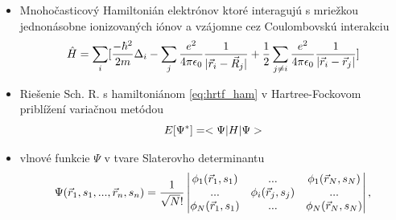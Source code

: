 \documentclass[
	11pt, %
]{beamer}
\begin{document}
\begin{frame}

\begin{itemize}
\item Mnohočasticový Hamiltonián elektrónov ktoré interagujú s mriežkou jednonásobne ionizovaných iónov a vzájomne cez Coulombovskú interakciu 
\begin{equation}
\label{eq:hrtf_ham}
\hat{H}=\sum_i [ \frac{-\hbar^2}{2m}\Delta_i  -\sum_j\frac{e^2}{4\pi \epsilon_0}{\frac{1}{|\vec{r}_i-\vec{R}_j|}} +\frac{1}{2}\sum_{j\neq i}\frac{e^2}{4\pi\epsilon_0}\frac{1}{|\vec{r}_i-\vec{r}_j|} ]
\end{equation}
\item Riešenie Sch. R. s hamiltoniánom \eqref{eq:hrtf_ham} v Hartree-Fockovom priblížení variačnou metódou
\begin{equation}
\label{eq:erg_func}
E[\Psi^*]=<\Psi|H|\Psi>
\end{equation}
\item vlnové funkcie $\Psi$  v tvare Slaterovho determinantu 
\begin{equation}
\label{eq:slatter}
\Psi(\vec{r}_1,s_1,...,\vec{r}_n,s_n)=\frac{1}{\sqrt N!}
\begin{vmatrix}
\phi_1(\vec{r}_1,s_1)& ... & \phi_1(\vec{r}_N,s_N) \\
...& \phi_i(\vec{r}_j,s_j)& ... \\
\phi_N(\vec{r}_1,s_1)& ... & \phi_N(\vec{r}_N,s_N)
\end{vmatrix}
\text{,}
\end{equation}
\end{itemize}
\end{frame}
\end{document}
